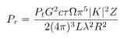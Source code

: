 \documentclass[preview]{standalone}
\begin{document}
\begin{align*}
\special{dvisvgm:raw <g id='unique000'>}P_r = \frac{P_t G^2 c \tau \Omega \pi^5 |K|^2 Z}{2 (4 \pi)^3 L \lambda^2 R^2}\special{dvisvgm:raw </g>}
\end{align*}
\end{document}
